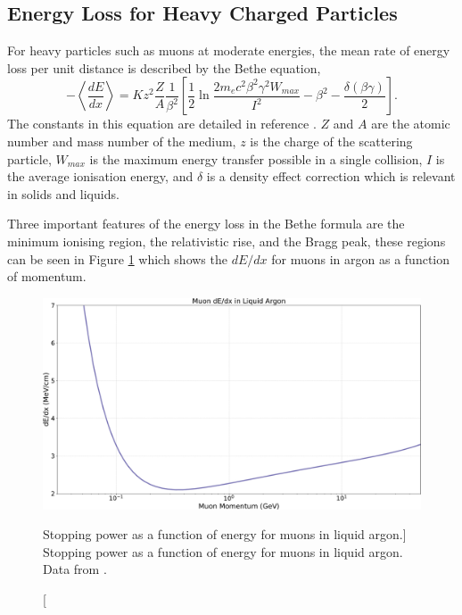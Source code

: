 \subsection{Energy Loss for Heavy Charged Particles}
For heavy particles such as muons at moderate energies, the mean rate of 
energy loss per unit distance is described by the Bethe equation,
\begin{equation}
	- \left< \frac{dE}{dx}\right> = K z^2 \frac{Z}{A} \frac{1}{\beta^2} 
	\left[ \frac{1}{2} \ln \frac{2 m_e c^2 \beta^2 \gamma^2 W_{max}}{I^2} -
	\beta^2 - \frac{\delta(\beta \gamma)}{2}\right].
	\label{eq:mu_stop}
\end{equation}
The constants in this equation are detailed in reference
\cite{PhysRevD.98.030001}. $Z$ and $A$ are the atomic number and mass number of
the medium, $z$ is the charge of the scattering particle, $W_{max}$ is the 
maximum energy transfer possible in a single collision, $I$ is the average 
ionisation energy, and $\delta$ is a density effect correction which is 
relevant in solids and liquids. 

Three important features of the energy loss in the Bethe formula are the minimum
ionising region, the relativistic rise, and the Bragg peak, these regions can be
seen in Figure \ref{fig:muon_dedx} which shows the $dE/dx$ for muons in argon 
as a function of momentum. 

\begin{figure}

	\centering

	\includegraphics[width=\textwidth]{figures/muon_dedx_argon.pdf}

	\caption
	[Stopping power as a function of energy for muons in liquid argon.]
	{ Stopping power as a function of energy for muons in liquid argon. Data from
	\cite{pdg_atomictables}.}

	\label{fig:muon_dedx}

\end{figure}


